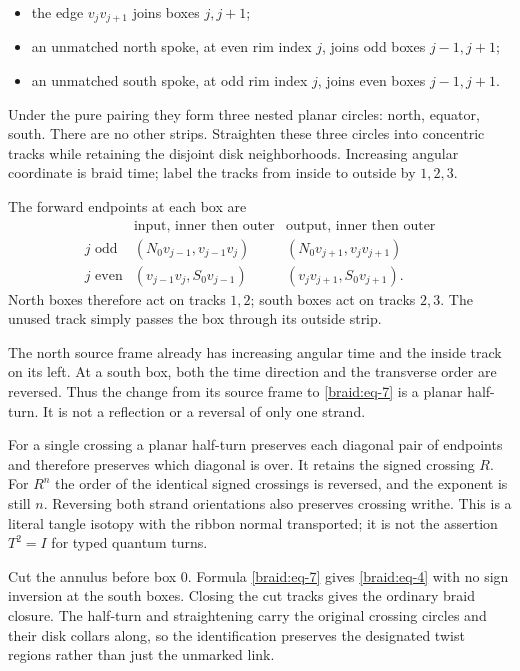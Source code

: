 \documentclass[11pt]{article}
\numberwithin{equation}{section}
\providecommand{\tightlist}{\setlength{\itemsep}{0pt}\setlength{\parskip}{0pt}}
\begin{document}
\begin{itemize}
\tightlist
\item
  the edge \(v_jv_{j+1}\) joins boxes \(j,j+1\);
\item
  an unmatched north spoke, at even rim index \(j\), joins odd boxes
  \(j-1,j+1\);
\item
  an unmatched south spoke, at odd rim index \(j\), joins even boxes
  \(j-1,j+1\).
\end{itemize}

Under the pure pairing they form three nested planar circles: north,
equator, south. There are no other strips. Straighten these three
circles into concentric tracks while retaining the disjoint disk
neighborhoods. Increasing angular coordinate is braid time; label the
tracks from inside to outside by \(1,2,3\).

The forward endpoints at each box are \begin{equation}\label{braid:eq-7}
\begin{array}{c|c|c}
 &\text{input, inner then outer}
 &\text{output, inner then outer}\\ \hline
 j\text{ odd}
 &(N_0v_{j-1},v_{j-1}v_j)
 &(N_0v_{j+1},v_jv_{j+1})\\
 j\text{ even}
 &(v_{j-1}v_j,S_0v_{j-1})
 &(v_jv_{j+1},S_0v_{j+1}).
\end{array}
\end{equation} North boxes therefore act on tracks \(1,2\); south boxes act on
tracks \(2,3\). The unused track simply passes the box through its
outside strip.

The north source frame already has increasing angular time and the
inside track on its left. At a south box, both the time direction and
the transverse order are reversed. Thus the change from its source frame
to \eqref{braid:eq-7} is a planar half-turn. It is not a reflection or a reversal of only one strand.

For a single crossing a planar half-turn preserves each diagonal pair of
endpoints and therefore preserves which diagonal is over. It retains the
signed crossing \(R\). For \(R^n\) the order of the identical signed
crossings is reversed, and the exponent is still \(n\). Reversing both
strand orientations also preserves crossing writhe. This is a literal
tangle isotopy with the ribbon normal transported; it is not the
assertion \(T^2=I\) for typed quantum turns.

Cut the annulus before box 0. Formula \eqref{braid:eq-7} gives \eqref{braid:eq-4} with no sign
inversion at the south boxes. Closing the cut tracks gives the ordinary
braid closure. The half-turn and straightening carry the original
crossing circles and their disk collars along, so the identification
preserves the designated twist regions rather than just the unmarked
link.
\end{document}
